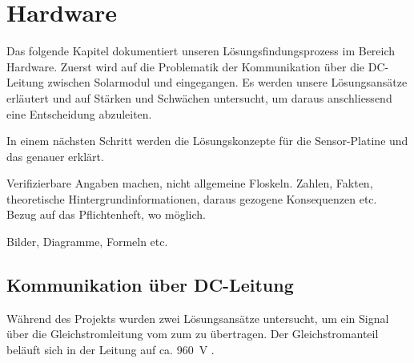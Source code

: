 \chapter{Hardware}
\label{chap:hardware}

Das folgende Kapitel dokumentiert  unseren L\"osungsfindungsprozess im Bereich
Hardware. Zuerst  wird  auf  die  Problematik  der  Kommunikation  \"uber  die
DC-Leitung  zwischen  Solarmodul  und \Master  eingegangen. Es  werden  unsere
L\"osungsans\"atze erl\"autert  und auf St\"arken und  Schw\"achen untersucht,
um daraus anschliessend eine Entscheidung abzuleiten.

In   einem  n\"achsten   Schritt  werden   die  L\"osungskonzepte   f\"ur  die
Sensor-Platine und das \Master genauer erkl\"art.

\anweisung Verifizierbare  Angaben machen, nicht  allgemeine Floskeln. Zahlen,
Fakten,  theoretische Hintergrundinformationen,  daraus gezogene  Konsequenzen
etc. Bezug auf das Pflichtenheft, wo m\"oglich.

\anweisung Bilder, Diagramme, Formeln etc.


\section{Kommunikation \"uber DC-Leitung}
\label{sec:hardware:dcLeitung}

W\"ahrend  des   Projekts  wurden   zwei  L\"osungsans\"atze   untersucht,  um
ein  Signal  \"uber   die  Gleichstromleitung  vom  \Sensor   zum  \Master  zu
\"ubertragen. Der  Gleichstromanteil   bel\"auft  sich  in  der   Leitung  auf
ca. \SI{960}{\volt} .

